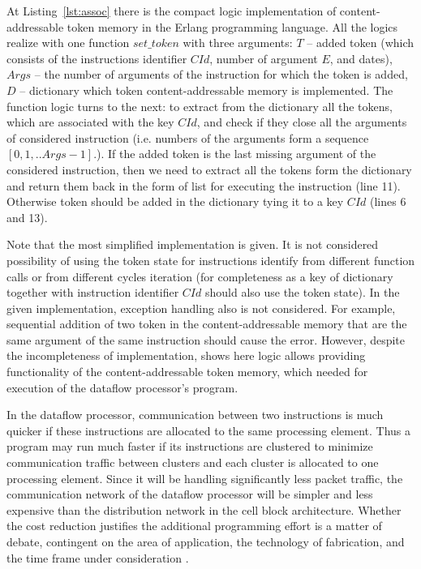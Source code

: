 \documentclass[
11pt,%
tightenlines,%
twoside,%
onecolumn,%
nofloats,%
nobibnotes,%
nofootinbib,%
superscriptaddress,%
noshowpacs,%
centertags]%
{revtex4}
\begin{document}
At Listing~\ref{lst:assoc} there is the compact logic implementation of content-addressable token memory in the Erlang programming language.
All the logics realize with one function $set\_token$ with three arguments: $T$ -- added token (which consists of the instructions identifier $CId$, number of argument $E$, and dates), $Args$ -- the number of arguments of the instruction for which the token is added, $D$ -- dictionary which token content-addressable memory is implemented.
The function logic turns to the next: to extract from the dictionary all the tokens, which are associated with the key $CId$, and check if they close all the arguments of considered instruction (i.e. numbers of the arguments form a sequence $[0, 1, .. Args - 1]$.).
If the added token is the last missing argument of the considered instruction, then we need to extract all the tokens form the dictionary and return them back in the form of list for executing the instruction (line 11).
Otherwise token should be added in the dictionary tying it to a key $CId$ (lines 6 and 13).

Note that the most simplified implementation is given.
It is not considered possibility of using the token state for instructions identify from different function calls or from different cycles iteration (for completeness as a key of dictionary together with instruction identifier $CId$ should also use the token state).
In the given implementation, exception handling also is not considered.
For example, sequential addition of two token in the content-addressable memory that are the same argument of the same instruction should cause the error.
However, despite the incompleteness of implementation, shows here logic allows providing functionality of the content-addressable token memory, which needed for execution of the dataflow processor’s program.

In the dataflow processor, communication between two instructions is much quicker if these instructions are allocated to the same processing element.
Thus a program may run much faster if its instructions are clustered to minimize communication traffic between clusters and each cluster is allocated to one processing element.
Since it will be handling significantly less packet traffic, the communication network of the dataflow processor will be simpler and less expensive than the distribution network in the cell block architecture.
Whether the cost reduction justifies the additional programming effort is a matter of debate, contingent on the area of application, the technology of fabrication, and the time frame under consideration \cite{Dennis}.
\end{document}
